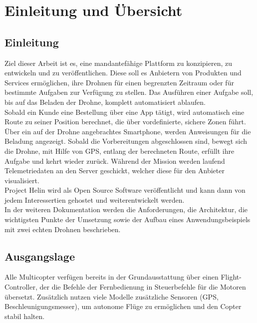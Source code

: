 \chapter{Einleitung und Übersicht}

\section{Einleitung}

Ziel dieser Arbeit ist es, eine mandantefähige Plattform zu konzipieren, zu entwickeln und zu veröffentlichen. Diese soll es Anbietern von Produkten und Services ermöglichen, ihre Drohnen für einen begrenzten Zeitraum oder für bestimmte Aufgaben zur Verfügung zu stellen. Das Ausführen einer Aufgabe soll, bis auf das Beladen der Drohne, komplett automatisiert ablaufen. \\

Sobald ein Kunde eine Bestellung über eine App tätigt, wird automatisch eine Route zu seiner Position berechnet, die über vordefinierte, sichere Zonen führt. Über ein auf der Drohne angebrachtes Smartphone, werden Anweisungen für die Beladung angezeigt. Sobald die Vorbereitungen abgeschlossen sind, bewegt sich die Drohne, mit Hilfe von GPS, entlang der berechneten Route, erfüllt ihre Aufgabe und kehrt wieder zurück. Während der Mission werden laufend Telemetriedaten an den Server geschickt, welcher diese für den Anbieter visualisiert.\\

Project Helin wird als Open Source Software veröffentlicht und kann dann von jedem Interessertien gehostet und weiterentwickelt werden.\\

In der weiteren Dokumentation werden die Anforderungen, die Architektur, die wichtigsten Punkte der Umsetzung sowie der Aufbau eines Anwendungsbeispiels mit zwei echten Drohnen beschrieben.

\section{Ausgangslage}

Alle Multicopter verfügen bereits in der Grundausstattung über einen \Gls{Flight-Controller}, der die Befehle der Fernbedienung in Steuerbefehle für die Motoren übersetzt. Zusätzlich nutzen viele Modelle zusätzliche Sensoren (GPS, Beschleunigungsmesser), um autonome Flüge zu ermöglichen und den Copter stabil halten. \\

